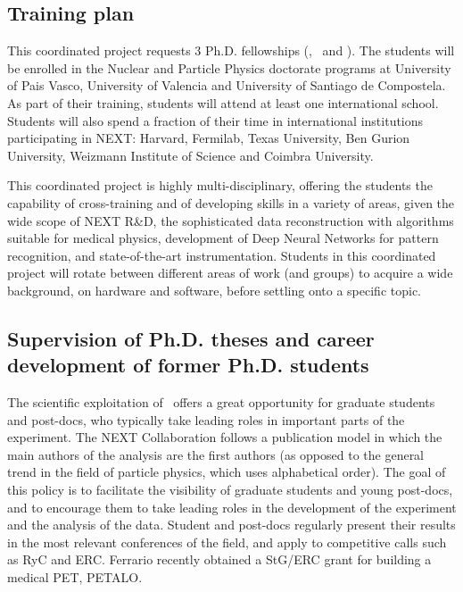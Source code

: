 \subsection{\label{subsubsec:training}Training plan}

\indent 

This coordinated project requests 3 Ph.D. fellowships (\sDIPC, \sIFIC\ and \sUSC). The students will be enrolled in the Nuclear and Particle Physics doctorate programs at University of Pais Vasco, University of Valencia and University of Santiago de Compostela. As part of their training, students will attend at least one international school. Students will also spend a fraction of their time in international institutions participating in NEXT: Harvard, Fermilab, Texas University, Ben Gurion University, Weizmann Institute of Science and Coimbra University.

\indent 

This coordinated project is highly multi-disciplinary, offering the students the capability of cross-training and of developing skills in a variety of areas, given the wide scope of NEXT R\&D, the sophisticated data reconstruction with algorithms suitable for medical physics, development of Deep Neural Networks for pattern recognition, and state-of-the-art instrumentation. Students in this coordinated project will rotate between different areas of work (and groups) to acquire a wide background, on hardware and software, before settling onto a specific topic.

\subsection{Supervision of Ph.D. theses and career development of former Ph.D. students}

The scientific exploitation of \Next\ offers a great opportunity for graduate students and post-docs, who typically take leading roles in important parts of the experiment. The NEXT Collaboration follows a publication model in which the main authors of the analysis are the first authors (as opposed to the general trend in the field of particle physics, which uses alphabetical order). The goal of this policy is to facilitate the visibility of graduate students and young post-docs, and to encourage them to take leading roles in the development of the experiment and the analysis of the data. Student and post-docs regularly present their results in the most relevant conferences of the field, and apply to competitive calls such as RyC and ERC. Ferrario recently obtained a StG/ERC grant for building a medical PET, PETALO.

